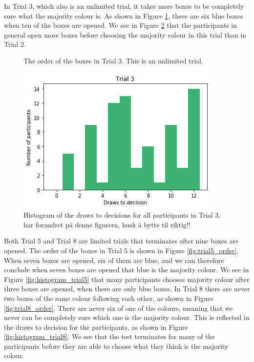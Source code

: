 In Trial 3, which also is an unlimited trial, it takes more boxes to be completely sure what the majority colour is. As shown in Figure \ref{fig:trial3_order}, there are six blue boxes when ten of the boxes are opened. We see in Figure \ref{fig:histogram_trial3} that the participants in general open more boxes before choosing the majority colour in this trial than in Trial 2. 

\begin{figure}
    \centering
    \scalebox{0.8}{}
    \caption[Order of boxes in Trial 3]{The order of the boxes in Trial 3. This is an unlimited trial.}
    \label{fig:trial3_order}
\end{figure}

\begin{figure}
    \centering
    \includegraphics[scale=0.6]{pictures/dtd3_histogram.png}
    \caption[Draws to decisions in Trial 3]{Histogram of the draws to decisions for all participants in Trial 3. 
    har forandret på denne figurern, husk å bytte til riktig!!}
    \label{fig:histogram_trial3}
\end{figure}

Both Trial 5 and Trial 8 are limited trials that terminates after nine boxes are opened. The order of the boxes in Trial 5 is shown in Figure \ref{fig:trial5_order}. When seven boxes are opened, six of them are blue, and we can therefore conclude when seven boxes are opened that blue is the majority colour. We see in Figure \ref{fig:histogram_trial5} that many participants chooses majority colour after three boxes are opened, when there are only blue boxes. In Trial 8 there are never two boxes of the same colour following each other, as shown in Figure \ref{fig:trial8_order}. There are never six of one of the colours, meaning that we never can be completely sure which one is the majority colour. This is reflected in the draws to decision for the participants, as shown in Figure \ref{fig:histogram_trial8}. We see that the test terminates for many of the participants before they are able to choose what they think is the majority colour. 

